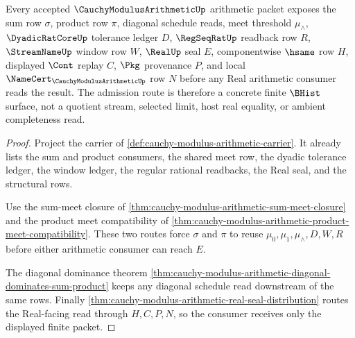 \begin{theorem}
\label{thm:cauchy-modulus-arithmetic-sum-product-carrier-admission}
Every accepted $\CauchyModulusArithmeticUp$ arithmetic packet exposes the sum row $\sigma$, product row $\pi$, diagonal schedule reads, meet threshold $\mu_{\wedge}$, $\DyadicRatCoreUp$ tolerance ledger $D$, $\RegSeqRatUp$ readback row $R$, $\StreamNameUp$ window row $W$, $\RealUp$ seal $E$, componentwise $\hsame$ row $H$, displayed $\Cont$ replay $C$, $\Pkg$ provenance $P$, and local $\NameCert_{\CauchyModulusArithmeticUp}$ row $N$ before any Real arithmetic consumer reads the result. The admission route is therefore a concrete finite $\BHist$ surface, not a quotient stream, selected limit, host real equality, or ambient completeness read.
\end{theorem}
\begin{proof}
Project the carrier of \autoref{def:cauchy-modulus-arithmetic-carrier}. It already lists the sum and product consumers, the shared meet row, the dyadic tolerance ledger, the window ledger, the regular rational readbacks, the Real seal, and the structural rows.

Use the sum-meet closure of \autoref{thm:cauchy-modulus-arithmetic-sum-meet-closure} and the product meet compatibility of \autoref{thm:cauchy-modulus-arithmetic-product-meet-compatibility}. These two routes force $\sigma$ and $\pi$ to reuse $\mu_0,\mu_1,\mu_{\wedge},D,W,R$ before either arithmetic consumer can reach $E$.

The diagonal dominance theorem \autoref{thm:cauchy-modulus-arithmetic-diagonal-dominates-sum-product} keeps any diagonal schedule read downstream of the same rows. Finally \autoref{thm:cauchy-modulus-arithmetic-real-seal-distribution} routes the Real-facing read through $H,C,P,N$, so the consumer receives only the displayed finite packet.
\end{proof}


